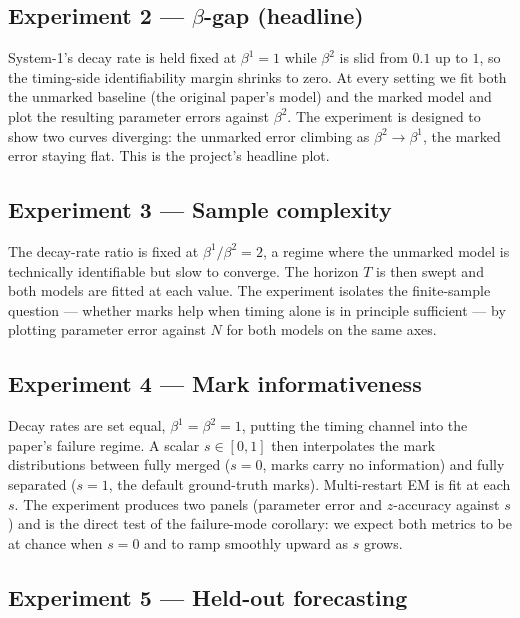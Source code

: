 \documentclass[11pt]{article}
\begin{document}
\subsection{Experiment 2 --- $\beta$-gap (headline)}

System-1's decay rate is held fixed at $\beta^1 = 1$ while $\beta^2$ is slid from $0.1$ up to $1$, so the timing-side identifiability margin shrinks to zero. At every setting we fit both the unmarked baseline (the original paper's model) and the marked model and plot the resulting parameter errors against $\beta^2$. The experiment is designed to show two curves diverging: the unmarked error climbing as $\beta^2 \to \beta^1$, the marked error staying flat. This is the project's headline plot.

\subsection{Experiment 3 --- Sample complexity}

The decay-rate ratio is fixed at $\beta^1/\beta^2 = 2$, a regime where the unmarked model is technically identifiable but slow to converge. The horizon $T$ is then swept and both models are fitted at each value. The experiment isolates the finite-sample question --- whether marks help when timing alone is in principle sufficient --- by plotting parameter error against $N$ for both models on the same axes.

\subsection{Experiment 4 --- Mark informativeness}

Decay rates are set equal, $\beta^1 = \beta^2 = 1$, putting the timing channel into the paper's failure regime. A scalar $s \in [0, 1]$ then interpolates the mark distributions between fully merged ($s = 0$, marks carry no information) and fully separated ($s = 1$, the default ground-truth marks). Multi-restart EM is fit at each $s$. The experiment produces two panels (parameter error and $z$-accuracy against $s$) and is the direct test of the failure-mode corollary: we expect both metrics to be at chance when $s = 0$ and to ramp smoothly upward as $s$ grows.

\subsection{Experiment 5 --- Held-out forecasting}
\end{document}
